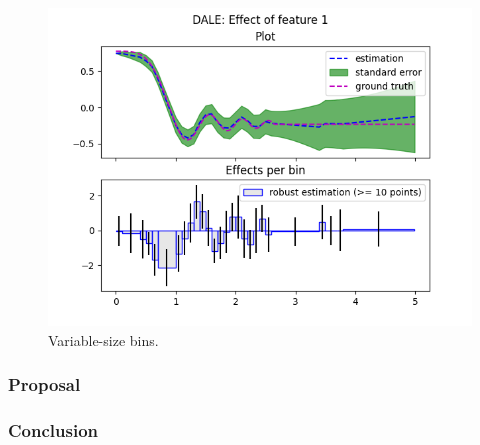 \documentclass{article}
\begin{document}
\begin{figure}[!h]
  \centering
  \includegraphics[width=.75\linewidth]{bullet_4/im_4.png}
  \caption{Variable-size bins.}
  \label{fig:bullet-4-im-3}
\end{figure}


\subsubsection*{Proposal}




\subsubsection*{Conclusion}
\end{document}
